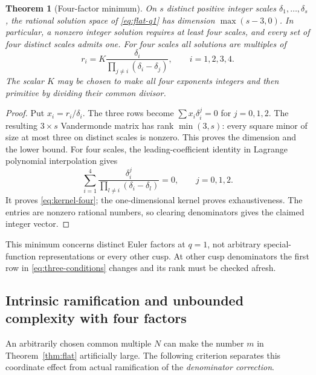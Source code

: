 \documentclass[11pt,a4paper]{article}
\numberwithin{equation}{section}
\newtheorem{theorem}{Theorem}[section]
\theoremstyle{definition}\newtheorem{definition}[theorem]{Definition}
\theoremstyle{remark}\newtheorem{remark}[theorem]{Remark}
\begin{document}
\begin{theorem}[Four-factor minimum]\label{thm:four}
On $s$ distinct positive integer scales $\delta_1,\ldots,\delta_s$, the
rational solution space of \eqref{eq:flat-q1} has dimension
$\max(s-3,0)$. In particular, a nonzero integer solution requires at
least four scales, and every set of four distinct scales admits one.
For four scales all solutions are multiples of
\begin{equation}\label{eq:kernel-four}
 r_i=K\frac{\delta_i}
              {\prod_{j\ne i}(\delta_i-\delta_j)},\qquad i=1,2,3,4.
\end{equation}
The scalar $K$ may be chosen to make all four exponents integers and
then primitive by dividing their common divisor.
\end{theorem}
\begin{proof}
Put $x_i=r_i/\delta_i$. The three rows become
$\sum x_i\delta_i^j=0$ for $j=0,1,2$.
The resulting $3\times s$ Vandermonde matrix has rank $\min(3,s)$:
every square minor of size at most three on distinct scales is nonzero.
This proves the dimension and the lower bound.
For four scales, the leading-coefficient identity in Lagrange polynomial
interpolation gives
\[
 \sum_{i=1}^4
 \frac{\delta_i^j}{\prod_{l\ne i}(\delta_i-\delta_l)}=0,
 \qquad j=0,1,2.
\]
It proves \eqref{eq:kernel-four}; the one-dimensional kernel proves
exhaustiveness. The entries are nonzero rational numbers, so clearing
denominators gives the claimed integer vector.
\end{proof}
This minimum concerns distinct Euler factors at $q=1$, not arbitrary
special-function representations or every other cusp. At other cusp
denominators the first row in \eqref{eq:three-conditions} changes and
its rank must be checked afresh.


\subsection{Intrinsic ramification and unbounded complexity with four factors}
An arbitrarily chosen common multiple $N$ can make the number $m$ in
Theorem~\ref{thm:flat} artificially large. The following criterion
separates this coordinate effect from actual ramification of the
\emph{denominator correction}.
\end{document}
